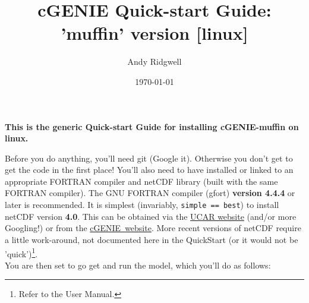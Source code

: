 \documentclass[10pt,twoside]{article}
\title{cGENIE Quick-start Guide: 'muffin' version [linux]}
\author{Andy Ridgwell} \date{\today} %
\begin{document}

\maketitle


\noindent \textbf{This is the generic Quick-start Guide for installing cGENIE-muffin on linux.}

\noindent Before you do anything, you'll need git (Google
it). Otherwise you don't get to get the code in the first place!
You'll also need to have installed or linked to an appropriate FORTRAN
compiler and netCDF library (built with the same FORTRAN
compiler). The GNU FORTRAN compiler (gfort) \textbf{version 4.4.4} or
later is recommended. It
is simplest (invariably, \texttt{simple == best}) to install netCDF
version \textbf{4.0}. This can be obtained via the
\href{http://www.unidata.ucar.edu/software/netcdf/}{UCAR website}
(and/or more Googling!) or from the
\href{http://www.seao2.info//cgenie/software/netcdf-4.0.tar.gz}{cGENIE\ website}. More
recent versions of netCDF require a little work-around, not documented
here in the QuickStart (or it would not be 'quick')\footnote{Refer to
  the User Manual.}.  \\ You are then set to go get and run the model,
which you'll do as follows:

\end{document}
